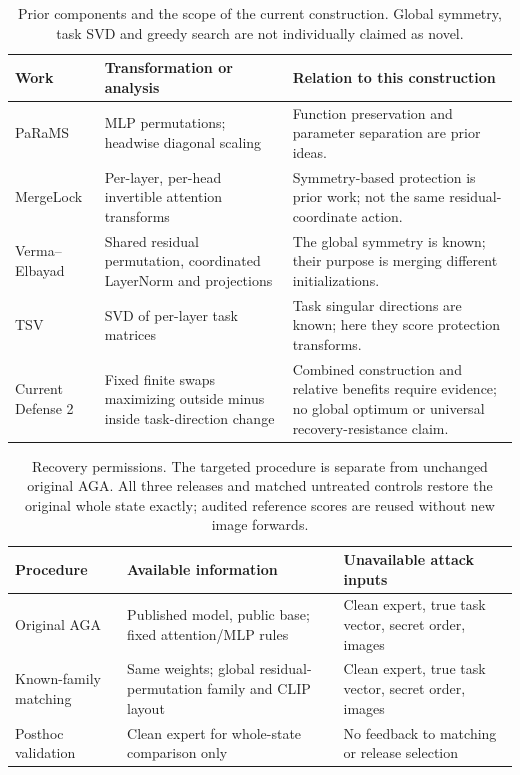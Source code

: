 \begin{table}[t]
\centering\small
\caption{Prior components and the scope of the current construction. Global symmetry, task SVD and greedy search are not individually claimed as novel.}
\label{tab:task-directed-contribution}
\begin{tabularx}{\linewidth}{lXX}
\toprule
Work & Transformation or analysis & Relation to this construction \\
\midrule
PaRaMS & MLP permutations; headwise diagonal scaling & Function preservation and parameter separation are prior ideas. \\
MergeLock & Per-layer, per-head invertible attention transforms & Symmetry-based protection is prior work; not the same residual-coordinate action. \\
Verma--Elbayad & Shared residual permutation, coordinated LayerNorm and projections & The global symmetry is known; their purpose is merging different initializations. \\
TSV & SVD of per-layer task matrices & Task singular directions are known; here they score protection transforms. \\
Current Defense 2 & Fixed finite swaps maximizing outside minus inside task-direction change & Combined construction and relative benefits require evidence; no global optimum or universal recovery-resistance claim. \\
\bottomrule
\end{tabularx}
\end{table}

\begin{table}[t]
\centering\small
\caption{Recovery permissions. The targeted procedure is separate from unchanged original AGA. All three releases and matched untreated controls restore the original whole state exactly; audited reference scores are reused without new image forwards.}
\label{tab:task-directed-recovery-permissions}
\begin{tabularx}{\linewidth}{lXX}
\toprule
Procedure & Available information & Unavailable attack inputs \\
\midrule
Original AGA & Published model, public base; fixed attention/MLP rules & Clean expert, true task vector, secret order, images \\
Known-family matching & Same weights; global residual-permutation family and CLIP layout & Clean expert, true task vector, secret order, images \\
Posthoc validation & Clean expert for whole-state comparison only & No feedback to matching or release selection \\
\bottomrule
\end{tabularx}
\end{table}

